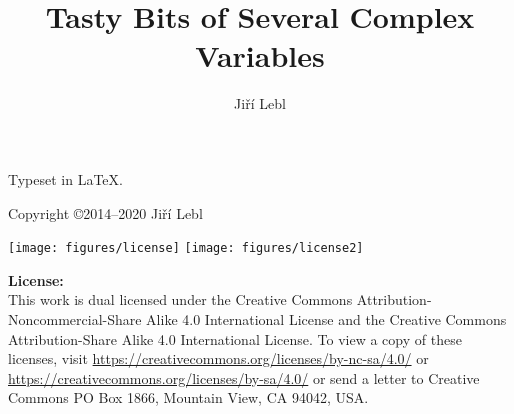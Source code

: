 \documentclass[12pt,openany]{book}
\author{Ji\v{r}\'i Lebl}
\title{Tasty Bits of Several Complex Variables}
\theoremstyle{plain}
\theoremstyle{remark}
\theoremstyle{definition}
\theoremstyle{exercise}
\theoremstyle{example}
\begin{document}
\ifpdf
\fi
\newlength{\centeroffset}
\setlength{\centeroffset}{-0.5\oddsidemargin}
\addtolength{\centeroffset}{0.5\evensidemargin}
\thispagestyle{empty}
\noindent\hspace*{\centeroffset}

\noindent\hspace*{\centeroffset}



\pagebreak

\vspace*{\fill}

\noindent
Typeset in \LaTeX.

\bigskip

\noindent
Copyright \copyright 2014--2020 Ji{\v r}\'i Lebl


\bigskip

\noindent
\texttt{[image: figures/license]}
\quad
\texttt{[image: figures/license2]}

\bigskip

\noindent
\textbf{License:}
\\
This work is dual licensed under
the Creative Commons
Attribution-Non\-commercial-Share Alike 4.0 International License and
the Creative Commons
Attribution-Share Alike 4.0 International License.
To view a
copy of these licenses, visit
\url{https://creativecommons.org/licenses/by-nc-sa/4.0/}
or
\url{https://creativecommons.org/licenses/by-sa/4.0/}
or send a letter to
Creative Commons
PO Box 1866, Mountain View, CA 94042, USA\@.
\end{document}
